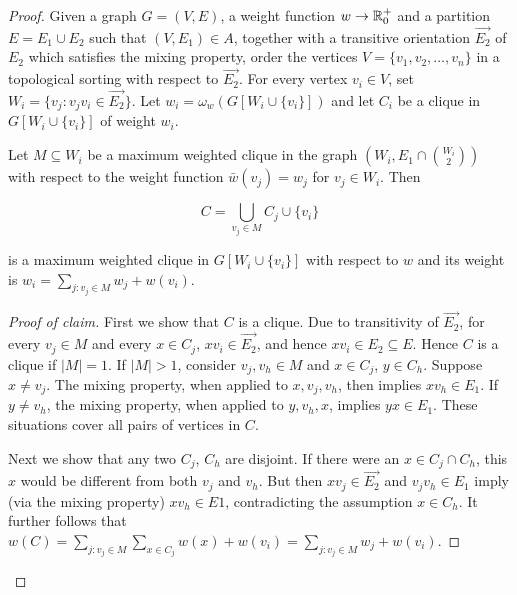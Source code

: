 \begin{proof}
	Given a graph $G = (V, E)$, a weight function $w \to \mathbb{R}_0^+$ and a partition $E = E_1 \cup E_2$ such that $(V, E_1) \in A$, together with a transitive orientation $\overrightarrow{E_2}$ of $E_2$ which satisfies the mixing property, order the vertices $V = \{v_1 , v_2 , \dots , v_n\}$ in a topological sorting with respect to $\overrightarrow{E_2}$. For every vertex $v_i \in V$, set $W_i = \{v_j : v_j v_i \in \overrightarrow{E_2}\}$. Let $w_i = \omega_w (G[W_i \cup \{v_i\}])$ and let $C_i$ be a clique in $G[W_i \cup \{v_i\}]$ of weight $w_i$.
	
	\begin{claim}
		Let $M \subseteq W_i$ be a maximum weighted clique in the graph $(W_i , E_1 \cap \binom{W_i}{2})$ with respect to the weight function $\bar{w}(v_j) = w_j$ for $v_j \in W_i$. Then
		
		$$
		C = \bigcup_{v_j \in M} C_j \cup \{v_i\}
		$$
		
		is a maximum weighted clique in $G[W_i \cup \{v_i\}]$ with respect to $w$ and its weight is $w_i = \sum_{j: v_j \in M} w_j + w(v_i)$.
	\end{claim}
	
	\begin{proof}[Proof of claim]
		First we show that $C$ is a clique. Due to transitivity of $\overrightarrow{E_2}$, for every $v_j \in M$ and every $x \in C_j$, $xv_i \in \overrightarrow{E_2}$, and hence $xv_i \in E_2 \subseteq E$. Hence $C$ is a clique if $|M| = 1$. If $|M| > 1$, consider $v_j, v_h \in M$ and $x \in C_j$, $y \in C_h$. Suppose $x \neq v_j$. The mixing property, when applied to $x, v_j , v_h$, then implies $xv_h \in E_1$. If $y \neq v_h$, the mixing property, when applied to $y, v_h , x$, implies $yx \in E_1$. These situations cover all pairs of vertices in $C$.
		
		Next we show that any two $C_j$, $C_h$ are disjoint. If there were an $x \in C_j \cap C_h$, this $x$ would be different from both $v_j$ and $v_h$. But then $xv_j \in \overrightarrow{E_2}$ and $v_j v_h \in E_1$ imply (via the mixing property) $xv_h \in E1$, contradicting the assumption $x \in C_h$. It further follows that $w(C) = \sum_{j:v_j \in M} \sum_{x \in C_j} w(x) + w(v_i) = \sum_{j:v_j \in M} w_j + w(v_i)$.
		

\end{proof}
\end{proof}
